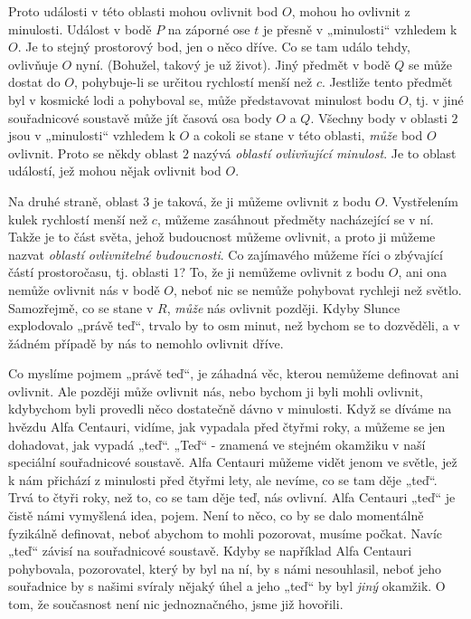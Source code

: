     Proto události v této oblasti mohou ovlivnit bod \(O\), mohou ho ovlivnit z minulosti. Událost 
    v bodě \(P\) na záporné ose \(t\) je přesně v „minulosti“ vzhledem k \(O\). Je to stejný 
    prostorový bod, jen o něco dříve. Co se tam událo tehdy, ovlivňuje \(O\) nyní. (Bohužel, takový 
    je už život). Jiný předmět v bodě \(Q\) se může dostat do \(O\), pohybuje-li se určitou 
    rychlostí menší než \(c\). Jestliže tento předmět byl v kosmické lodi a pohyboval se, může 
    představovat minulost bodu \(O\), tj. v jiné souřadnicové soustavě může jít časová osa body 
    \(O\) a \(Q\). Všechny body v oblasti \(2\) jsou v „minulosti“ vzhledem k \(O\) a cokoli se 
    stane v této oblasti, \emph{může} bod \(O\) ovlivnit. Proto se někdy oblast \(2\) nazývá 
    \emph{oblastí ovlivňující minulost}. Je to oblast událostí, jež mohou nějak ovlivnit bod \(O\).
    
    Na druhé straně, oblast \(3\) je taková, že ji můžeme ovlivnit z bodu \(O\). Vystřelením kulek 
    rychlostí menší než \(c\), můžeme zasáhnout předměty nacházející se v ní. Takže je to část 
    světa, jehož budoucnost můžeme ovlivnit, a proto ji můžeme nazvat \emph{oblastí ovlivnitelné 
    budoucnosti}. Co zajímavého můžeme říci o zbývající částí prostoročasu, tj. oblasti \(1\)? To, 
    že ji nemůžeme ovlivnit z bodu \(O\), ani ona nemůže ovlivnit nás v bodě \(O\), neboť nic se 
    nemůže pohybovat rychleji než světlo. Samozřejmě, co se stane v \(R\), \emph{může} nás ovlivnit 
    později. Kdyby Slunce explodovalo „právě teď“, trvalo by to osm minut, než bychom se to 
    dozvěděli, a v žádném případě by nás to nemohlo ovlivnit dříve.
    
    Co myslíme pojmem „právě teď“, je záhadná věc, kterou nemůžeme definovat ani ovlivnit. Ale 
    později může ovlivnit nás, nebo bychom ji byli mohli ovlivnit, kdybychom byli provedli něco 
    dostatečně dávno v minulosti. Když se díváme na hvězdu Alfa Centauri, vidíme, jak vypadala před 
    čtyřmi roky, a můžeme se jen dohadovat, jak vypadá „teď“. „Teď“ - znamená ve stejném okamžiku 
    v naší speciální souřadnicové soustavě. Alfa Centauri můžeme vidět jenom ve světle, jež k nám 
    přichází z minulosti před čtyřmi lety, ale nevíme, co se tam děje „teď“. Trvá to čtyři roky, 
    než to, co se tam děje teď, nás ovlivní. Alfa Centauri „teď“ je čistě námi vymyšlená idea, 
    pojem. Není to něco, co by se dalo momentálně fyzikálně definovat, neboť abychom to mohli 
    pozorovat, musíme počkat. Navíc „teď“ závisí na souřadnicové soustavě. Kdyby se například Alfa 
    Centauri pohybovala, pozorovatel, který by byl na ní, by s námi nesouhlasil, neboť jeho 
    souřadnice by s našimi svíraly nějaký úhel a jeho „teď“ by byl \emph{jiný} okamžik. O tom, že 
    současnost není nic jednoznačného, jsme již hovořili.
    

